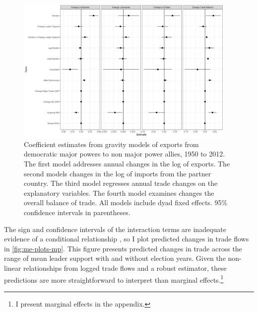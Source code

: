 \documentclass[12pt]{article}
\begin{document}
\begin{figure}
\centering
\includegraphics[width=0.95\textwidth]{../figures/mp-model-coefs.png}
\caption{Coefficient estimates from gravity models of exports from democratic major powers to non major power allies, 1950 to 2012. The first model addresses annual changes in the log of exports. The second models changes in the log of imports from the partner country. The third model regresses annual trade changes on the explanatory variables. The fourth model examines changes the overall balance of trade. All models include dyad fixed effects. 95\% confidence intervals in parentheses.}
\label{fig:mp-model-coefs}
\end{figure}



The sign and confidence intervals of the interaction terms are inadequate evidence of a conditional relationship \citep{BramborClarkGolder2006}, so I plot predicted changes in trade flows in \autoref{fig:me-plots-mp}.
This figure presents predicted changes in trade across the range of mean leader support with and without election years. 
Given the non-linear relationships from logged trade flows and a robust estimator, these predictions are more straightforward to interpret than marginal effects.\footnote{I present marginal effects in the appendix.} 
\end{document}
